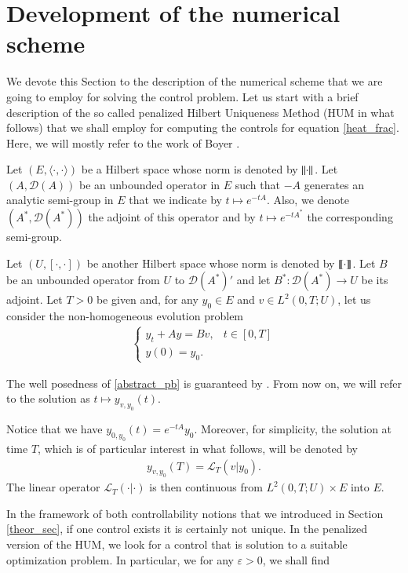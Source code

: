 \section{Development of the numerical scheme}\label{fe_sec}

We devote this Section to the description of the numerical scheme that we are going to employ for solving the control problem. Let us start with a brief description of the so called penalized Hilbert Uniqueness Method (HUM in what follows) that we shall employ for computing the controls for equation \eqref{heat_frac}. Here, we will mostly refer to the work of Boyer \cite{boyer2013penalised}.

Let $(E,\langle\cdot,\cdot\rangle)$ be a Hilbert space whose norm is denoted by ${\left\|\cdot\right\|}_{}$. Let $(A,\mathcal D(A))$ be an unbounded operator in $E$ such that $-A$ generates an analytic semi-group in $E$ that we indicate by $t\mapsto e^{-tA}$. Also, we denote $(A^*,\mathcal D(A^*))$ the adjoint of this operator and by $t\mapsto e^{-tA^*}$ the corresponding semi-group. 

Let $(U,[\cdot,\cdot])$ be another Hilbert space whose norm is denoted by $\llbracket \cdot\rrbracket$. Let  $B$ be an unbounded operator from $U$ to $\mathcal D(A^*)'$ and let $B^*:\mathcal D(A^*)\to U$ be its adjoint. Let $T>0$ be given and, for any $y_0\in E$ and $v\in L^2(0,T;U)$, let us consider the non-homogeneous evolution problem  
\begin{align}\label{abstract_pb}
	\begin{cases}
		y_t+Ay=Bv, & t\in[0,T]
		\\
		y(0)=y_0.
	\end{cases}
\end{align}

The well posedness of \eqref{abstract_pb} is guaranteed by \cite[Theorem 2.37]{coron2007control}. From now on, we will refer to the solution as $t\mapsto y_{v,y_0}(t)$.

Notice that we have $y_{0,y_0}(t)= e^{-tA}y_0$. Moreover, for simplicity, the solution at time $T$, which is of particular interest in what follows, will be denoted by 
\begin{align*}
	y_{v,y_0}(T)=\mathcal{L}_T(v|y_0).
\end{align*} 
The linear operator $\mathcal{L}_T(\cdot|\cdot)$ is then continuous from $L^2(0,T;U)\times E$ into $E$.

In the framework of both controllability notions that we introduced in Section \ref{theor_sec}, if one control exists it is certainly not unique. In the penalized version of the HUM, we look for a control that is solution to a suitable optimization problem. In particular, we for any $\varepsilon>0$, we shall find

